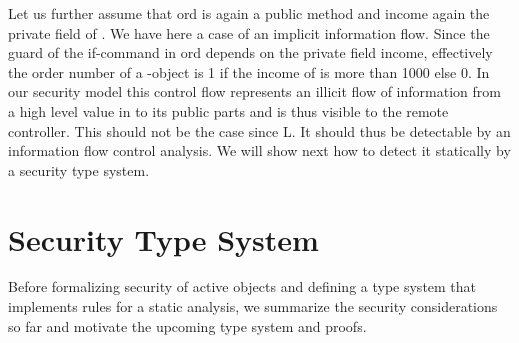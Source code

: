 \documentclass[10pt, conference, compsocconf]{IEEEtran}
\begin{document}
{\begin{small}

\end{small}

Let us further assume that ord is again a public method and income again the private field of
.
We have here a case of an implicit information flow. Since the guard of the if-command in ord 
depends on the private field income, effectively the order number of a -object is 1 if the 
income of  is more than 1000 else 0. In our security model this control flow represents
an illicit flow of information from a high level value in  to its public parts and is thus 
visible to the remote controller. This should not be the case since  L. 
It should thus be detectable by an information flow control analysis. We will show next how to
 detect it statically by a security type system.





\section{Security Type System}
\label{sec:types}
Before formalizing security of active objects and defining a type system that implements
rules for a static analysis, we summarize the security considerations so far and motivate the 
upcoming type system and proofs.
}
\end{document}
